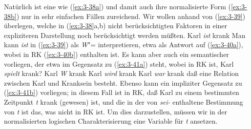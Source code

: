 \documentclass[output=paper]{langsci/langscibook}
\begin{document}
Natürlich ist eine  wie
(\ref{ex:3-38a}) und damit auch ihre normalisierte Form
(\ref{ex:3-38b}) nur in sehr einfachen Fällen zureichend. Wir wollen
anhand von (\ref{ex:3-39}) überlegen, welche in (\ref{ex:3-38}a,b) nicht berücksichtigten Faktoren in einer expliziteren
Darstellung noch berücksichtigt werden müßten.
\ea \label{ex:3-39}
Karl \textit{ist} krank
\z
Man kann \textit{ist} in (\ref{ex:3-39}) als \textit{W}"= interpretieren, etwa als
Antwort auf (\ref{ex:3-40a}), wobei in RK (\ref{ex:3-40b}) enthalten ist. Es kann aber
auch ein semantischer  vorliegen, der etwa im Gegensatz zu (\ref{ex:3-41a}) steht, wobei in RK ist,
\eal \label{ex:3-40}
\ex
\label{ex:3-40a}
Karl \textit{spielt} krank?
\ex
\label{ex:3-40b}
Karl \textit{W} krank
\zl
\eal \label{ex:3-41}
\ex
\label{ex:3-41a}
Karl \textit{wird} krank
\ex
\label{ex:3-41b}
Karl \emph{war} krank
\zl
daß eine Relation zwischen Karl und Kranksein besteht. Ebenso kann ein
impliziter Gegensatz zu (\ref{ex:3-41b}) vorliegen; in diesem Fall ist in RK,
daß Karl zu einem bestimmten Zeitpunkt \textit{t} krank (gewesen) ist, und
die in der  von \textit{sei-} enthaltene Bestimmung von
\textit{t} ist das, was nicht in RK ist. Um dies darzustellen, müssen wir in
der normalisierten logischen Charakterisierung eine Variable für \textit{t}
ansetzen.
\end{document}
